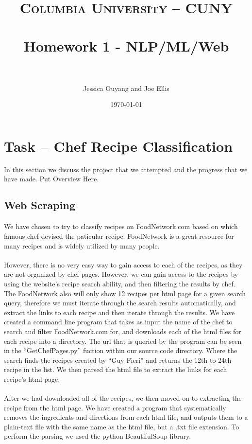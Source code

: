 \documentclass[paper=a4, fontsize=11pt]{scrartcl} %
\title{	
\normalfont \normalsize 
\textsc{Columbia University -- CUNY} \\ [25pt] %
\horrule{0.5pt} \\[0.4cm] %
\huge Homework 1 - NLP/ML/Web \\ %
\horrule{2pt} \\[0.5cm] %
}
\author{Jessica Ouyang and Joe Ellis} %
\date{\normalsize\today} %
\begin{document}
\maketitle %


\section{Task -- Chef Recipe Classification}
In this section we discuss the project that we attempted and the progress that we have made. {\color{red} Put Overview Here.}

\subsection{Web Scraping}

\paragraph{}
We have chosen to try to classify recipes on FoodNetwork.com based on which famous chef devised the paticular recipe.  
FoodNetwork is a great resource for many recipes and is widely utilized by many people.

\paragraph{}
However, there is no very easy way to gain access to each of the recipes, as they are not organized by chef pages.  However, we can gain access to the recipes by using the website’s recipe search ability, and then filtering the results by chef.  The FoodNetwork also will only show 12 recipes per html page for a given search query, therefore we must iterate through the search results automatically, and extract the links to each recipe and then iterate through the results.  We have created a command line program that takes as input the name of the chef to search and filter FoodNetwork.com for, and downloads each of the html files for each recipe into a directory.  The url that is queried by the program can be seen in the ``GetChefPages.py'' fuction within our source code directory.  Where the search finds the recipes created by “Guy Fieri” and returns the 12th to 24th recipe in the list.  We then parsed the html file to extract the links for each recipe’s html page.

\paragraph{}
After we had downloaded all of the recipes, we then moved on to extracting the recipe from the html page.  We have created a program that systematically removes the ingredients and directions from each html file, and outputs them to a plain-text file with the same name as the html file, but a .txt file extension.  To perform the parsing we used the python BeautifulSoup library.
\end{document}
